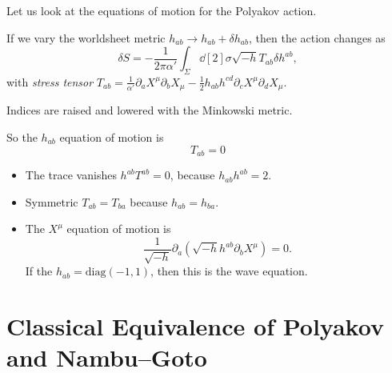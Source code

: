 
Let us look at the equations of motion for the Polyakov action.

\begin{exercise}
  If we vary the worldsheet metric $h_{ab} \to h_{ab} + \delta h_{ab}$, then the action changes as 
  \begin{equation}
    \delta S = -\frac{1}{2\pi \alpha'} \int_\Sigma \dd[2]{\sigma} \sqrt{-h} T_{ab} \delta h^{ab},
  \end{equation}
  with \emph{stress tensor} $T_{ab} = \frac{1}{\alpha'} \partial_{a} X^{\mu} \partial_{b} X_{\mu} - \frac{1}{2} h_{ab} h^{cd} \partial_{c} X^{\mu} \partial_{d} X_{\mu}$.
\end{exercise}
\begin{leftbar}
  \begin{remark}
    Indices are raised and lowered with the Minkowski metric.
  \end{remark}
\end{leftbar}

So the $h_{ab}$ equation of motion is 
\begin{equation}
  \boxed{T_{ab} = 0}
\end{equation}

\begin{remark}
  \begin{itemize}
    \item The trace vanishes $h^{ab} T^{ab} = 0$, because $h_{ab} h^{ab} = 2$.
    \item Symmetric $T_{ab} = T_{ba}$ because $h_{ab} = h_{ba}$.
    \item The $X^{\mu}$ equation of motion is
      \begin{equation}
	\frac{1}{\sqrt{-h}} \partial_{a} \left(\sqrt{-h} h^{ab} \partial_{b} X^{\mu}\right) = 0.
      \end{equation}
      If the $h_{ab} = \text{diag}(-1, 1)$, then this is the wave equation.
  \end{itemize}
\end{remark}

\section{Classical Equivalence of Polyakov and Nambu--Goto}%
\label{sec:classical_equivalence_of_polyakov_and_nambu_goto}

